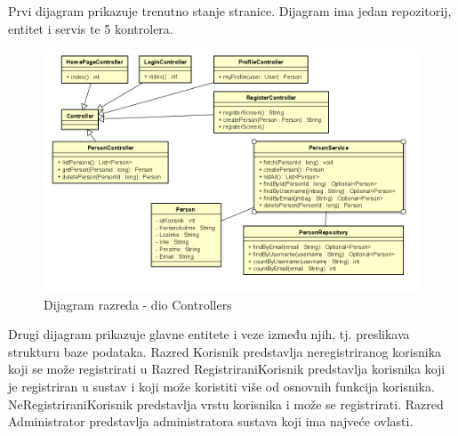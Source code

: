 		Prvi dijagram prikazuje trenutno stanje stranice. Dijagram ima jedan repozitorij, entitet i servis te 5 kontrolera.
		\begin{figure}[H]
			\includegraphics[scale=0.75]{slike/dijagram_razreda2.png} %
			\centering
			\caption{Dijagram razreda - dio Controllers}
			\label{fig:Dijagram_razreda2}
		\end{figure}


		Drugi dijagram prikazuje glavne entitete i veze između njih, 
		tj. preslikava strukturu baze podataka. Razred Korisnik 
		predstavlja neregistriranog korisnika koji se može registrirati 
		u Razred RegistriraniKorisnik predstavlja korisnika koji je registriran u sustav 
		i koji može koristiti više od osnovnih funkcija korisnika. NeRegistriraniKorisnik predstavlja vrstu korisnika i može se registrirati.
		Razred Administrator predstavlja administratora sustava koji ima najveće ovlasti. 



